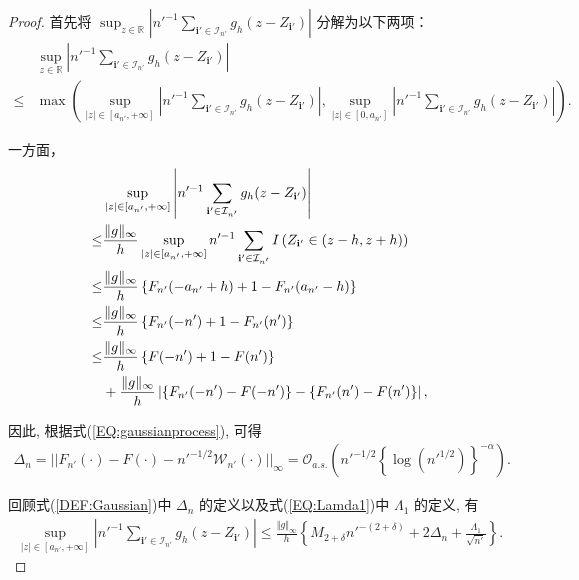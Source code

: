 \documentclass[a4paper,openay,14pt]{ctexbook}
\numberwithin{equation}{section}
\numberwithin{lem}{section}
\begin{document}
\begin{proof}
首先将 $\sup_{z\in\mathbb{R}}\left\vert n'^{-1}\sum_{\mathbf{i}' \in\mathcal{I}_{n'}}g_h(z-Z_{\mathbf{i}'})\right\vert$ 分解为以下两项：
\begin{align*}
    &\sup_{z\in\mathbb{R}}\left\vert n'^{-1}\sum_{\mathbf{i}' \in\mathcal{I}_{n'}}g_h(z-Z_{\mathbf{i}'})\right\vert\\
    \leq& \max\left(\sup_{\vert z\vert\in\left[a_{n'},+\infty\right]}\left\vert n'^{-1}\sum_{\mathbf{i}'\in\mathcal{I}_{n'}}g_h(z-Z_{\mathbf{i}'})\right\vert, \sup_{\vert z\vert\in\left[0,a_{n'}\right]}\left\vert n'^{-1}\sum_{\mathbf{i}'\in\mathcal{I}_{n'}}g_h(z-Z_{\mathbf{i}'})\right\vert\right).
\end{align*}

一方面，
\begin{align*}
    &\sup_{\vert z\vert\in\left[a_{n'},+\infty\right]}\left\vert n'^{-1}\sum_{\mathbf{i}'\in\mathcal{I}_{n'}}g_h(z-Z_{\mathbf{i}'})\right\vert  \\
    \leq &\frac{\Vert g\Vert_{\infty}}{h}\sup_{\vert z\vert\in\left[a_{n'},+\infty\right]}n'^{-1}\sum_{\mathbf{i}'\in\mathcal{I}_{n'}}I\left(Z_{\mathbf{i}'}\in(z-h,z+h)\right)\\
    \leq &\frac{\Vert g\Vert_{\infty}}{h}\left\{F_{n'}(-a_{n'}+h)+1-F_{n'}(a_{n'}-h)\right\} \notag\\
    \leq &\frac{\Vert g\Vert_{\infty}}{h}\left\{F_{n'}(-n')+1-F_{n'}(n')\right\} \\
    \leq &\frac{\Vert g\Vert_{\infty}}{h}\left\{F(-n')+1-F(n')\right\} \\
    & + \frac{\Vert g\Vert_{\infty}}{h}\left\vert\left\{F_{n'}(-n')-F(-n')\right \}-\left \{F_{n'}(n')-F(n')\right\} \right\vert,
\end{align*}

因此, 根据式(\ref{EQ:gaussianprocess}), 可得
\begin{equation}
\begin{aligned} \label{DEF:Gaussian}
\Delta_n
=||F_{n'}(\cdot)-F(\cdot)-n'^{-1/2}\mathcal{W}_{n'}(\cdot)||_{\infty}
=\mathcal{O}_{a.s.}\left(n'^{-1/2}\left\{\log (n'^{1/2})\right\}^{-\alpha}\right).
\end{aligned}
\end{equation}

回顾式(\ref{DEF:Gaussian})中 $\Delta_n$ 的定义以及式(\ref{EQ:Lamda1})中 $\Lambda_1$ 的定义, 有
\begin{align} \label{EQ:Situ1}
\sup_{\vert z\vert\in\left[a_{n'},+\infty\right]}
\left\vert n'^{-1}\sum_{\mathbf{i}'\in\mathcal{I}_{n'}}g_h(z-Z_{\mathbf{i}'})\right\vert
\leq
\frac{\Vert g\Vert_{\infty}}{h}
\left\{M_{2+\delta}n'^{-(2+\delta)} + 2\Delta_n + \frac{\Lambda_1}{\sqrt{n'}}\right\}.
\end{align}


\end{proof}
\end{document}
